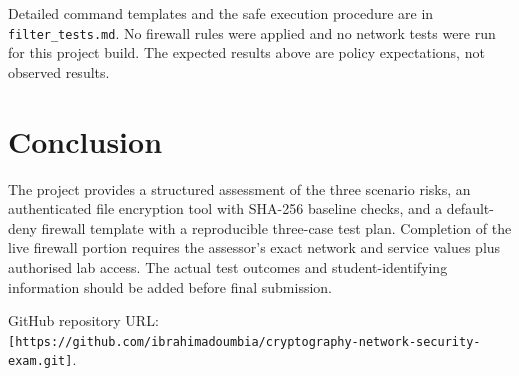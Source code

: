 \documentclass[11pt,a4paper]{article}
\begin{document}
Detailed command templates and the safe execution procedure are in \texttt{filter\_tests.md}. No firewall rules were applied and no network tests were run for this project build. The expected results above are policy expectations, not observed results.

\section{Conclusion}
The project provides a structured assessment of the three scenario risks, an authenticated file encryption tool with SHA-256 baseline checks, and a default-deny firewall template with a reproducible three-case test plan. Completion of the live firewall portion requires the assessor's exact network and service values plus authorised lab access. The actual test outcomes and student-identifying information should be added before final submission.

GitHub repository URL: \texttt{[https://github.com/ibrahimadoumbia/cryptography-network-security-exam.git]}.
\end{document}
